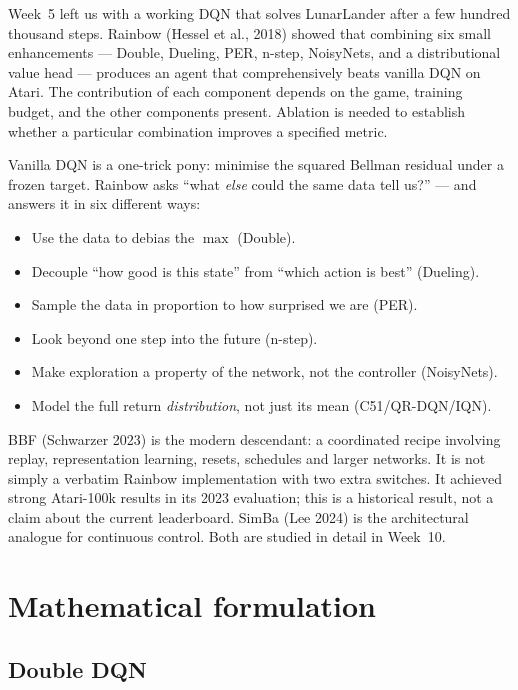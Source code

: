\documentclass[11pt,oneside]{scrbook}
\begin{document}
Week~5 left us with a working DQN that solves LunarLander after a few hundred thousand
steps. Rainbow (Hessel et al., 2018) showed that combining six small enhancements ---
Double, Dueling, PER, n-step, NoisyNets, and a distributional value head --- produces an
agent that comprehensively beats vanilla DQN on Atari. The contribution of each component depends on the game, training budget,
and the other components present. Ablation is needed to establish whether
a particular combination improves a specified metric.

\begin{intuition}
Vanilla DQN is a one-trick pony: minimise the squared Bellman residual under a frozen
target. Rainbow asks ``what \emph{else} could the same data tell us?'' --- and answers it
in six different ways:
\begin{itemize}
  \item Use the data to debias the $\max$ (Double).
  \item Decouple ``how good is this state'' from ``which action is best'' (Dueling).
  \item Sample the data in proportion to how surprised we are (PER).
  \item Look beyond one step into the future (n-step).
  \item Make exploration a property of the network, not the controller (NoisyNets).
  \item Model the full return \emph{distribution}, not just its mean (C51/QR-DQN/IQN).
\end{itemize}
\end{intuition}

BBF (Schwarzer 2023) is the modern descendant: a coordinated recipe involving replay, representation learning, resets,
schedules and larger networks. It is not simply a verbatim Rainbow
implementation with two extra switches. It achieved strong Atari-100k results in its 2023 evaluation; this is a
historical result, not a claim about the current leaderboard. SimBa (Lee
2024) is the architectural analogue for continuous control. Both are studied in detail in
Week~10.

\chapter{Mathematical formulation}

\section{Double DQN}
\end{document}
